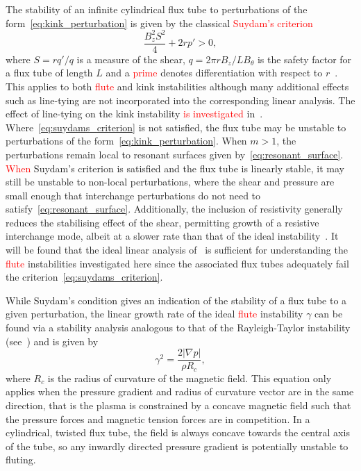 \documentclass[12pt]{article}
\newcommand{\rs}[2]{\textcolor{red}{#2}}
\begin{document}
The stability of an infinite cylindrical flux tube to perturbations of
the form~\eqref{eq:kink_perturbation} is given by the classical
\rs{}{Suydam's criterion \cite{Suydam1959}}
\begin{equation}
  \label{eq:suydams_criterion}
\frac{B_z^2 S^2}{4} + 2 r p' > 0,
\end{equation}
where $S = r q'/q$ is a measure of the shear, $q = 2\pi r B_z / L
B_{\theta}$ is the safety factor for a flux tube of length $L$ and a
\rs{dash}{prime} denotes differentiation with respect to
$r$~\cite{mikhailovskiiInstabilitiesConfinedPlasma1998}. This applies
to both \rs{fluting}{flute} and kink instabilities although many
additional effects such as line-tying are not incorporated into the
corresponding linear analysis. The effect of line-tying on the kink
instability \rs{can be found}{is investigated}
in~\cite{hoodKinkInstabilitySolar1979}. Where~\eqref{eq:suydams_criterion}
is not satisfied, the flux tube may be unstable to perturbations of
the form~\eqref{eq:kink_perturbation}. When $m>1$, the perturbations
remain local to resonant surfaces given
by~\eqref{eq:resonant_surface}. 
\rs{}{When} Suydam's criterion is satisfied and the flux tube is linearly stable, it may still be unstable to non-local perturbations, where the shear and pressure are small enough that interchange perturbations do not need to satisfy~\eqref{eq:resonant_surface}. Additionally, the inclusion of resistivity generally reduces the stabilising effect of the shear, permitting growth of a resistive interchange mode, albeit at a slower rate than that of the ideal instability~\cite{mikhailovskiiInstabilitiesConfinedPlasma1998}. It will be found that the ideal linear analysis of~\cite{mikhailovskiiInstabilitiesConfinedPlasma1998} is sufficient for understanding the \rs{fluting}{flute} instabilities investigated here since the associated flux tubes adequately fail the criterion~\eqref{eq:suydams_criterion}.

While Suydam's condition gives an indication of the stability of a flux tube to a given perturbation, the linear growth rate of the ideal \rs{fluting}{flute} instability $\gamma$ can be found via a stability analysis analogous to that of the Rayleigh-Taylor instability (see~\cite{goldstonIntroductionPlasmaPhysics2020}) and is given by
\begin{equation}
  \label{eq:fluting_growth_rate}
\gamma^2 = \frac{2|\nabla p|}{\rho R_c},
\end{equation}
where $R_c$ is the radius of curvature of the magnetic field. This equation only applies when the pressure gradient and radius of curvature vector are in the same direction, that is the plasma is constrained by a concave magnetic field such that the pressure forces and magnetic tension forces are in competition. In a cylindrical, twisted flux tube, the field is always concave towards the central axis of the tube, so any inwardly directed pressure gradient is potentially unstable to fluting.
\end{document}
